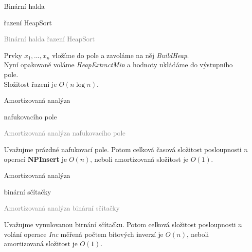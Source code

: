 \documentclass[20pt]{extarticle}
\newcommand{\card}[3][]{
	\vspace*{\fill}

	\newpage
	\topskip0pt
	\vspace*{\fill}
		\Large #2

		\vspace{1cm}
		\normalsize #1
	\vspace*{\fill}
	\newpage

	\small \textcolor{gray}{#2 #1}
	\topskip0pt
	\vspace*{\fill}

	\normalsize
	#3
	\vspace*{\fill}
}
\begin{document}
\begin{center}
\card[řazení HeapSort]{Binární halda}{
	Prvky $x_1, \dots, x_n$ vložíme do pole a zavoláme na něj \textit{BuildHeap}.\\
	Nyní opakovaně voláme \textit{HeapExtractMin} a hodnoty ukládáme do výstupního pole.\\
	Složitost řazení je $O(n \log n)$.
}

\card[nafukovacího pole]{Amortizovaná analýza}{
	Uvažujme prázdné nafukovací pole. Potom celková časová složitost posloupnosti
	$n$ operací \textbf{NPInsert} je $O(n)$, neboli amortizovaná složitost je $O(1)$.
}

\card[binární sčítačky]{Amortizovaná analýza}{
	Uvažujme vynulovanou birnání sčítačku. Potom celková složitost posloupnosti
	$n$ volání operace \textit{Inc} měřená počtem bitových inverzí je $O(n)$,
	neboli amortizovaná složitost je $O(1)$.
}

\end{center}
\end{document}
